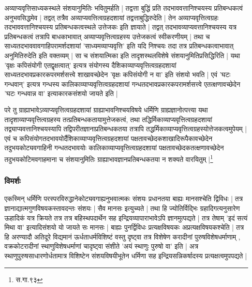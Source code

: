 अव्याप्यवृत्तिसाध्यकस्थले संशयानुमितिः भवितुमर्हति | तद्वत्ता बुद्धिं प्रति तदभाववत्तानिश्चयस्य प्रतिबन्धकत्वं अनुभवसिद्धमेव | तद्वत् तत्रैव अव्याप्यवत्तित्वग्रहदशायां तद्वत्ताबुद्धिरुदेति | तेन अव्याप्यवृत्तित्वग्रहः तदभाववत्तानिश्चयस्य प्रतिबन्धकत्वस्थले उत्तेजकः इति ज्ञायाते | तद्वत् तदभावव्याप्यवत्तानिश्चयस्य यत्र प्रतिबन्धकत्वं तत्रापि बाधकाभावात् अव्याप्यवृत्तित्वग्रहस्य उत्तेजकत्वं स्वीकरणीयम् | तथा च साध्यतदभाववावगाहिपरामर्शदशायां 'साध्यमव्याप्यवृत्ति' इति यदि निश्चयः तदा तत्र प्रतिबन्धकत्वाभावात् अनुमितिरुदेति इति वक्तव्यम् | सा च संशयात्मिका इति तादृशस्थलविशेषे संशयानुमितिप्रसिद्धिरिति | यथा 'वृक्षः कपिसंयोगी एतद्वृक्षत्वात्' इत्यत्र संयोगस्य दैशिकाव्याप्यवृत्तित्वग्रहदशायां साध्यतदभावप्रकारकपरमर्शसत्त्वे शाखावच्छेदेन 'वृक्षः कपिसंयोगी न वा' इति संशयो भवति | एवं 'घटः गन्धवान्' इत्यत्र गन्धस्य कालिकाव्याप्यवृत्तित्वग्रहदशायां गन्धतदभावप्रकारकपरामर्शसत्त्वे एतत्क्षणावच्छेदेन 'घटः गन्धवान्न वा' इत्याकारकसंशयो जायते इति |

{\fontsize{11.7}{0}\selectfont\s परे तु ग्राह्याभावेऽव्याप्यवृत्तित्वग्रहदशायां ग्राह्याभावनिश्चयविषये धर्मिणि ग्राह्यज्ञानोत्पत्त्या यथा तादृशाव्याप्यवृत्तित्वग्रहस्य तत्प्रतिबन्धकतायामुत्तेजकत्वं, तथा तद्धिर्मिकाव्याप्यवृत्तित्वग्रहदशायां तद्व्याप्यवत्तानिश्चयस्यापि तद्विपरीतज्ञानाप्रतिबन्धकतया तत्रापि तद्धर्मिकाव्याप्यवृत्तित्वग्रहस्योत्तेजकत्वमुपेयम् | एवं च कपिसंयोगतदभावयोर्दैशिकाव्याप्यवृत्तित्वग्रहदशायां पक्षतावच्छेदकशाखादिरूपैकावच्छेदेन तदुभयकोट्यवगाहिनी गन्धतदभावयोः कालिकाव्याप्यवृत्तित्वग्रहदशायां पक्षतावच्छेदकतत्क्षणावच्छेदेन तदुभयकोटिमवगाहमाना च संशयानुमितिः ग्राह्याभावज्ञानप्रतिबन्धकतया न शक्यते वारयितुम् |\footnote{स.गा.९३}}


\subsubsection{विमर्शः}

एकस्मिन् धर्मिणि परस्परविरुद्धानेकोट्यवगाह्यनुभवात्मकः संशयः प्रधानतया बाह्यः मानसश्चेति द्विविधः | तत्र ज्ञानाद्यात्मगुणविषयकस्तावदन्तः संशयः | सैव मानसः इत्युच्यते | तथा हि ज्योतिर्विद्भिः ग्रहादिगत्यनुसारेण ऊहादिकं यत्र क्रियते तत्र तत्र बहिस्थपदार्थेन सह इन्द्रियव्यापाराभावेऽपि ज्ञानमुत्पद्यते | तत्र तेषाम् 'इदं सत्यं मिथा वा' इत्यादिसंशयो यो जायते सः मानसः | बाह्यः पुनर्द्विविधः प्रत्यक्षविषयकः अप्रत्यक्षविषयकश्चेति | तत्र हि अरण्यादौ अतिदूरे विद्यमानं ऊर्धताधर्मविशिष्टं वस्तु दृष्ट्वा तत्र विशेषेण करादीनां पुरुषविशेषधर्माणाम् , वक्रकोटरादीनां स्थाणुविशेषधर्माणां चादृष्ट्वा संशीते 'अयं स्थाणुः पुरुषो वा' इति | अत्र स्थाणुपुरुषसाधारणोर्धतामात्र विशिष्टेन संशयविषयीभूतेन धर्मिणा सह इन्द्रियसन्निकर्षादस्य प्रत्यक्षत्वमुपपद्यते |

